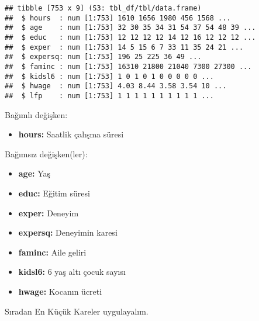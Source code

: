 \documentclass[
]{book}
\newenvironment{Shaded}{\begin{snugshade}}{\end{snugshade}}
\newcommand{\DataTypeTok}[1]{\textcolor[rgb]{0.13,0.29,0.53}{#1}}
\newcommand{\KeywordTok}[1]{\textcolor[rgb]{0.13,0.29,0.53}{\textbf{#1}}}
\newcommand{\NormalTok}[1]{#1}
\newcommand{\OperatorTok}[1]{\textcolor[rgb]{0.81,0.36,0.00}{\textbf{#1}}}
\newcommand{\StringTok}[1]{\textcolor[rgb]{0.31,0.60,0.02}{#1}}
\providecommand{\tightlist}{%
  \setlength{\itemsep}{0pt}\setlength{\parskip}{0pt}}
\begin{document}
\begin{verbatim}
## tibble [753 x 9] (S3: tbl_df/tbl/data.frame)
##  $ hours  : num [1:753] 1610 1656 1980 456 1568 ...
##  $ age    : num [1:753] 32 30 35 34 31 54 37 54 48 39 ...
##  $ educ   : num [1:753] 12 12 12 12 14 12 16 12 12 12 ...
##  $ exper  : num [1:753] 14 5 15 6 7 33 11 35 24 21 ...
##  $ expersq: num [1:753] 196 25 225 36 49 ...
##  $ faminc : num [1:753] 16310 21800 21040 7300 27300 ...
##  $ kidsl6 : num [1:753] 1 0 1 0 1 0 0 0 0 0 ...
##  $ hwage  : num [1:753] 4.03 8.44 3.58 3.54 10 ...
##  $ lfp    : num [1:753] 1 1 1 1 1 1 1 1 1 1 ...
\end{verbatim}

Bağımlı değişken:

\begin{itemize}
\tightlist
\item
  \textbf{hours:} Saatlik çalışma süresi
\end{itemize}

Bağımsız değişken(ler):

\begin{itemize}
\item
  \textbf{age:} Yaş
\item
  \textbf{educ:} Eğitim süresi
\item
  \textbf{exper:} Deneyim
\item
  \textbf{expersq:} Deneyimin karesi
\item
  \textbf{faminc:} Aile geliri
\item
  \textbf{kidsl6:} 6 yaş altı çocuk sayısı
\item
  \textbf{hwage:} Kocanın ücreti
\end{itemize}

Sıradan En Küçük Kareler uygulayalım.

\begin{Shaded}
\end{Shaded}
\end{document}
